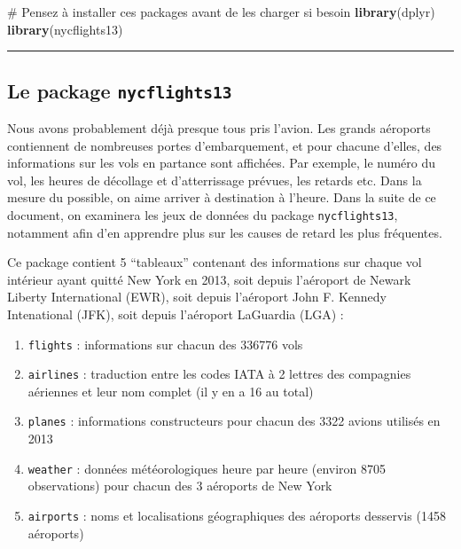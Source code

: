 \documentclass[a4paperpaper,]{article}
\newenvironment{Shaded}{\begin{snugshade}}{\end{snugshade}}
\newcommand{\CommentTok}[1]{\textcolor[rgb]{0.54,0.53,0.53}{#1}}
\newcommand{\KeywordTok}[1]{\textcolor[rgb]{0.12,0.11,0.11}{\textbf{#1}}}
\newcommand{\NormalTok}[1]{\textcolor[rgb]{0.12,0.11,0.11}{#1}}
\providecommand{\tightlist}{%
  \setlength{\itemsep}{0pt}\setlength{\parskip}{0pt}}
\begin{document}
\begin{Shaded}
\begin{Highlighting}[]
\CommentTok{# Pensez à installer ces packages avant de les charger si besoin}
\KeywordTok{library}\NormalTok{(dplyr)}
\KeywordTok{library}\NormalTok{(nycflights13)}
\end{Highlighting}
\end{Shaded}

\begin{center}\rule{0.5\linewidth}{\linethickness}\end{center}

\hypertarget{le-package-nycflights13}{%
\subsection{\texorpdfstring{Le package \texttt{nycflights13}}{Le package nycflights13}}\label{le-package-nycflights13}}

Nous avons probablement déjà presque tous pris l'avion. Les grands aéroports contiennent de nombreuses portes d'embarquement, et pour chacune d'elles, des informations sur les vols en partance sont affichées. Par exemple, le numéro du vol, les heures de décollage et d'atterrissage prévues, les retards etc. Dans la mesure du possible, on aime arriver à destination à l'heure. Dans la suite de ce document, on examinera les jeux de données du package \texttt{nycflights13}, notamment afin d'en apprendre plus sur les causes de retard les plus fréquentes.

Ce package contient 5 ``tableaux'' contenant des informations sur chaque vol intérieur ayant quitté New York en 2013, soit depuis l'aéroport de Newark Liberty International (EWR), soit depuis l'aéroport John F. Kennedy Intenational (JFK), soit depuis l'aéroport LaGuardia (LGA) :

\begin{enumerate}
\def\labelenumi{\arabic{enumi}.}
\tightlist
\item
  \texttt{flights} : informations sur chacun des 336776 vols
\item
  \texttt{airlines} : traduction entre les codes IATA à 2 lettres des compagnies aériennes et leur nom complet (il y en a 16 au total)
\item
  \texttt{planes} : informations constructeurs pour chacun des 3322 avions utilisés en 2013
\item
  \texttt{weather} : données météorologiques heure par heure (environ 8705 observations) pour chacun des 3 aéroports de New York
\item
  \texttt{airports} : noms et localisations géographiques des aéroports desservis (1458 aéroports)
\end{enumerate}
\end{document}
